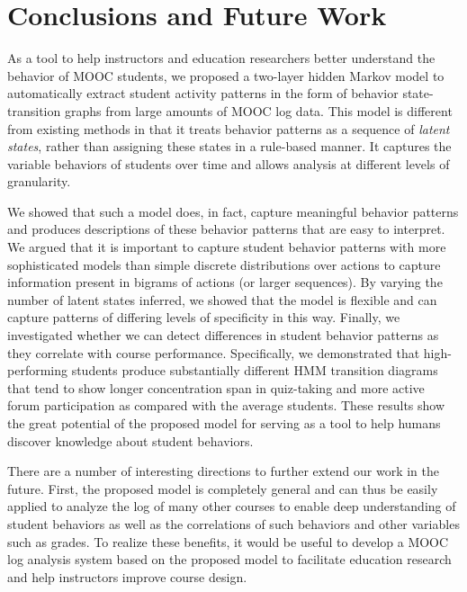 \section{Conclusions and Future Work}
As a tool to help instructors and education researchers better understand
the behavior of MOOC students, we proposed a two-layer hidden Markov model
to automatically extract student activity patterns in the form of behavior
state-transition graphs from large amounts of MOOC log data. This model is
different from existing methods in that it treats behavior patterns as a
sequence of \emph{latent states}, rather than assigning these states in a
rule-based manner. It captures the variable behaviors of students over time
and allows analysis at different levels of granularity.

We showed that such a model does, in fact, capture meaningful behavior
patterns and produces descriptions of these behavior patterns that are easy
to interpret. We argued that it is important to capture student behavior
patterns with more sophisticated models than simple discrete distributions
over actions to capture information present in bigrams of actions (or
larger sequences). By varying the number of latent states inferred, we
showed that the model is flexible and can capture patterns of differing
levels of specificity in this way.  Finally, we investigated whether we can
detect differences in student behavior patterns as they correlate with
course performance. Specifically, we demonstrated that high-performing
students produce substantially different HMM transition diagrams that tend
to show longer concentration span in quiz-taking and more active  forum
participation as compared with the average students.  These results show
the great potential of the proposed model for serving as a tool to help
humans discover knowledge about student behaviors.


There are a number of interesting directions to further extend our work in
the future.  First, the proposed model is completely general and can thus
be easily applied to analyze the log of many other courses to enable deep
understanding of student behaviors as well as the correlations of such
behaviors and other variables such as grades. To realize these benefits, it
would be useful to develop a MOOC log analysis system based on the proposed
model to facilitate education research and help instructors improve course
design.

